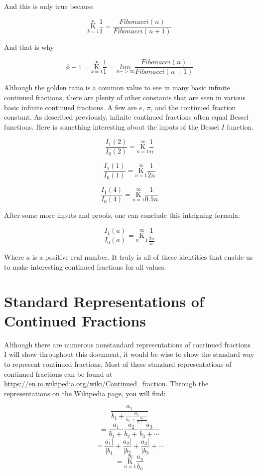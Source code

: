 \documentclass{article}
\begin{document}
And this is only true because

$$\underset{k=1}{\overset{n}{ \mathrm K}} \frac{1}{1} = \frac{Fibonacci(n)}{Fibonacci(n+1)} $$


And that is why

$$\phi - 1 = \underset{k=1}{\overset{\infty}{ \mathrm K}} \frac{1}{1} = \underset{n->\infty}{lim} \frac{Fibonacci(n)}{Fibonacci(n+1)}$$


Although the golden ratio is a common value to see in many basic infinite continued fractions, there are plenty of other constants that are seen in various basic infinite continued fractions. A few are $e$, $\pi$, and the continued fraction constant. As described previously, infinite continued fractions often equal Bessel functions. Here is something interesting about the inputs of the Bessel $I$ function.

$$\frac{I_1(2)}{I_0(2)} = \underset{n=1}{\overset{\infty}{ \mathrm K}} \frac{1}{n} $$

$$\frac{I_1(1)}{I_0(1)} = \underset{n=1}{\overset{\infty}{ \mathrm K}} \frac{1}{2n} $$

$$\frac{I_1(4)}{I_0(4)} = \underset{n=1}{\overset{\infty}{ \mathrm K}} \frac{1}{0.5n} $$

After some more inputs and proofs, one can conclude this intriguing formula:

$$\frac{I_1(a)}{I_0(a)} = \underset{n=1}{\overset{\infty}{ \mathrm K}} \frac{1}{\frac{2n}{a}} $$

Where $a$ is a positive real number.
It truly is all of these identities that enable us to make interesting continued fractions for all values.

\section{Standard Representations of Continued Fractions}

Although there are numerous nonstandard representations of continued fractions I will show throughout this document, it would be wise to show the standard way to represent continued fractions. Most of these standard representations of continued fractions can be found at \url{https://en.m.wikipedia.org/wiki/Continued_fraction}. Through the representations on the Wikipedia page, you will find:

$$\frac{a_1}{b_1+\frac{a_2}{b_2+\frac{a_3}{b_3+\cdots}}}$$
$$=\frac{a_1}{b_1+}\frac{a_2}{b_2+}\frac{a_3}{b_3+\cdots}$$
$$=\frac{a_1|}{|b_1} + \frac{a_2|}{|b_2} + \frac{a_3|}{|b_3} + \cdots$$
$$=\underset{n=1}{\overset{\infty}{\mathrm K}} \frac{a_n}{b_n}$$
\end{document}
